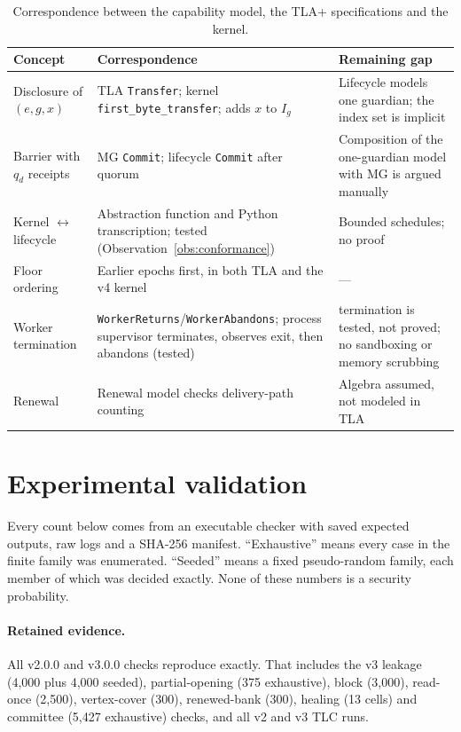 \documentclass[pdflatex,sn-mathphys-num,twocolumn]{sn-jnl}
\theoremstyle{plain}
\theoremstyle{definition}
\newcommand{\code}[1]{\texttt{#1}}
\begin{document}
\begin{table}[t]
\caption{Correspondence between the capability model, the TLA+ specifications and the kernel.}\label{tab:refine}
\centering\footnotesize
\begin{tabularx}{\linewidth}{@{}p{.25\linewidth}YY@{}}\toprule
Concept & Correspondence & Remaining gap\\\midrule
Disclosure of $(e,g,x)$ & TLA \code{Transfer}; kernel \code{first\_byte\_transfer}; adds $x$ to $I_g$ & Lifecycle models one guardian; the index set is implicit\\
Barrier with $q_d$ receipts & MG \code{Commit}; lifecycle \code{Commit} after quorum & Composition of the one-guardian model with MG is argued manually\\
Kernel $\leftrightarrow$ lifecycle & Abstraction function and Python transcription; tested (Observation~\ref{obs:conformance}) & Bounded schedules; no proof\\
Floor ordering & Earlier epochs first, in both TLA and the v4 kernel & ---\\
Worker termination & \code{WorkerReturns}/\code{WorkerAbandons}; process supervisor terminates, observes exit, then abandons (tested) & termination is tested, not proved; no sandboxing or memory scrubbing\\
Renewal & Renewal model checks delivery-path counting & Algebra assumed, not modeled in TLA\\\bottomrule
\end{tabularx}
\end{table}


\section{Experimental validation}\label{sec:evidence}

Every count below comes from an executable checker with saved expected outputs, raw logs and a SHA-256 manifest. ``Exhaustive'' means every case in the finite family was enumerated. ``Seeded'' means a fixed pseudo-random family, each member of which was decided exactly. None of these numbers is a security probability.

\paragraph{Retained evidence.}
All v2.0.0 and v3.0.0 checks reproduce exactly. That includes the v3 leakage (4,000 plus 4,000 seeded), partial-opening (375 exhaustive), block (3,000), read-once (2,500), vertex-cover (300), renewed-bank (300), healing (13 cells) and committee (5,427 exhaustive) checks, and all v2 and v3 TLC runs.
\end{document}
